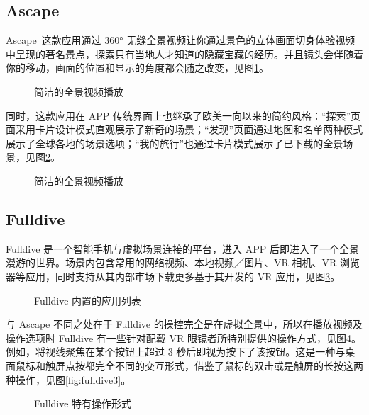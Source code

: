 \subsection{Ascape}

Ascape 这款应用通过 360° 无缝全景视频让你通过景色的立体画面切身体验视频中呈现的著名景点，探索只有当地人才知道的隐藏宝藏的经历。并且镜头会伴随着你的移动，画面的位置和显示的角度都会随之改变，见图\ref{fig:ascape1}。

\begin{figure}[htp]
\centering
{}
\caption{简洁的全景视频播放}
\label{fig:ascape1}
\end{figure}

同时，这款应用在 APP 传统界面上也继承了欧美一向以来的简约风格：“探索”页面采用卡片设计模式直观展示了新奇的场景；“发现”页面通过地图和名单两种模式展示了全球各地的场景选项；“我的旅行”也通过卡片模式展示了已下载的全景场景，见图\ref{fig:ascape2}。

\begin{figure}[htp]
\centering
{}
\caption{简洁的全景视频播放}
\label{fig:ascape2}
\end{figure}

\subsection{Fulldive}

Fulldive 是一个智能手机与虚拟场景连接的平台，进入 APP 后即进入了一个全景漫游的世界。场景内包含常用的网络视频、本地视频／图片、VR 相机、VR 浏览器等应用，同时支持从其内部市场下载更多基于其开发的 VR 应用，见图\ref{fig:fulldive1}。

\begin{figure}[htp]
\centering
{}
\caption{Fulldive 内置的应用列表}
\label{fig:fulldive1}
\end{figure}

与 Ascape 不同之处在于 Fulldive 的操控完全是在虚拟全景中，所以在播放视频及操作选项时 Fulldive 有一些针对配戴 VR 眼镜者所特别提供的操作方式，见图\ref{fig:fulldive2}。例如，将视线聚焦在某个按钮上超过 3 秒后即视为按下了该按钮。这是一种与桌面鼠标和触屏点按都完全不同的交互形式，借鉴了鼠标的双击或是触屏的长按这两种操作，见图\ref{fig:fulldive3}。

\begin{figure}[htp]
\centering
{}
\caption{Fulldive 特有操作形式}
\label{fig:fulldive2}
\end{figure}

